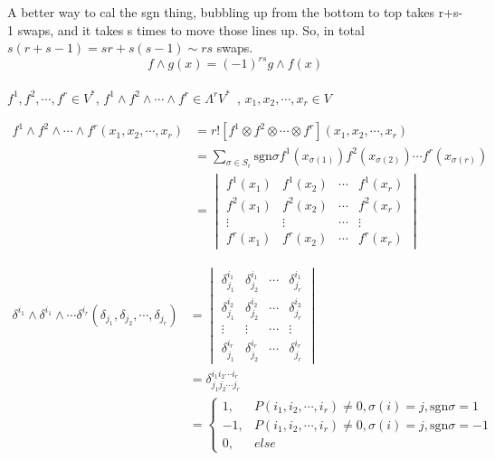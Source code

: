 \documentclass[12pt,a4paper]{article}
\begin{document}
A better way to cal the sgn thing, bubbling up from the bottom to top takes r+s-1 swaps, and it takes s times to move those lines up. So, in total $s(r+s-1) = sr+s(s-1) \sim rs$ swaps. \\

\[
	f\wedge g(x) = (-1)^{rs} g \wedge f(x)
\]\\


$f^1,f^2,\cdots,f^r \in V^*$, $f^1\wedge f^2 \wedge \cdots \wedge f^r \in   \Lambda^r V^*$ \,, $x_1, x_2, \cdots, x_r \in V$

\begin{align*}
	f^1\wedge f^2 \wedge \cdots \wedge f^r (x_1, x_2, \cdots, x_r) &= r![f^1\otimes f^2 \otimes \cdots \otimes f^r](x_1, x_2, \cdots, x_r) \\
	&=\sum_{\sigma \in S_r} \mathrm{sgn}\sigma f^1(x_{\sigma(1)})f^2(x_{\sigma(2)})\cdots f^r(x_{\sigma(r)}) \\
	&=\begin{vmatrix}
	f^1(x_1) &f^1(x_2) &\cdots &f^1(x_r) \\
	f^2(x_1) &f^2(x_2) &\cdots &f^2(x_r) \\
	\vdots&\vdots&\cdots &\vdots\\
	f^r(x_1) &f^r(x_2) &\cdots &f^r(x_r)
	\end{vmatrix}
\end{align*}

\begin{align*}
	\delta^{i_1} \wedge \delta^{i_1} \wedge \cdots \delta^{i_r} (\delta_{j_1},\delta_{j_2},\cdots,\delta_{j_r}) 
	&=\begin{vmatrix}
		\delta^{i_1}_{j_1} & \delta^{i_1}_{j_2} & \cdots &\delta^{i_1}_{j_r} \\
		\delta^{i_2}_{j_1} & \delta^{i_2}_{j_2} & \cdots &\delta^{i_2}_{j_r} \\
		\vdots&\vdots&\cdots &\vdots\\
		\delta^{i_r}_{j_1} & \delta^{i_r}_{j_2} & \cdots &\delta^{i_r}_{j_r}
	\end{vmatrix}\\
	&=\delta^{i_1 i_2 \cdots i_r}_{j_1 j_2 \cdots j_r} \\
	&=\begin{cases}
		1, & P(i_1, i_2 ,\cdots , i_r) \neq 0, \sigma(i) = j, \mathrm{sgn}\sigma = 1 \\
		-1, & P(i_1, i_2 ,\cdots , i_r) \neq 0, \sigma(i) = j, \mathrm{sgn}\sigma = -1 \\
		0, &else
	\end{cases} 	
\end{align*}
\end{document}

